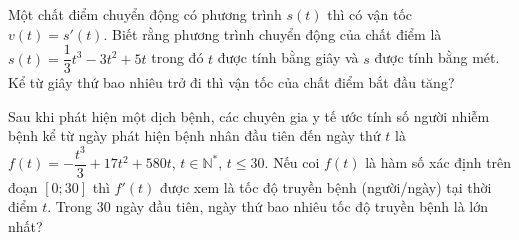 \begin{bt}%
	Một chất điểm chuyển động có phương trình $s(t)$ thì có vận tốc $v(t)=s'(t)$. Biết rằng phương trình chuyển động của chất điểm là $s(t)=\dfrac{1}{3}t^3-3t^2+5t$ trong đó $t$ được tính bằng giây và $s$ được tính bằng mét. Kể từ giây thứ bao nhiêu trở đi thì vận tốc của chất điểm bắt đầu tăng?
\end{bt}

\begin{bt}%
	Sau khi phát hiện một dịch bệnh, các chuyên gia y tế ước tính số người nhiễm bệnh kể từ ngày phát hiện bệnh nhân đầu tiên đến ngày thứ $t$ là $f(t)=-\dfrac{t^3}{3}+17t^2+580t$, $t\in \mathbb{N}^*$, $t\leq 30$. Nếu coi $f(t)$ là hàm số xác định trên đoạn $[0;30]$ thì $f'(t)$ được xem là tốc độ truyền bệnh (người/ngày) tại thời điểm $t$. Trong $30$ ngày đầu tiên, ngày thứ bao nhiêu tốc độ truyền bệnh là lớn nhất?
\end{bt}


